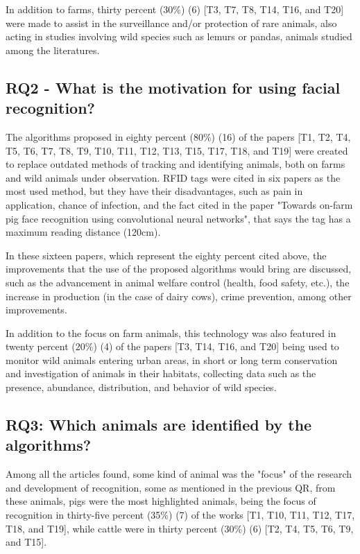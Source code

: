 \documentclass[alpha-refs,english]{RBCA_v3.0}
\begin{document}
In addition to farms, thirty percent (30\%) (6) [T3, T7, T8, T14, T16, and T20] were made to assist in the surveillance and/or protection of rare animals, also acting in studies involving wild species such as lemurs or pandas, animals studied among the literatures.

\subsection{RQ2 - What is the motivation for using facial recognition?}
The algorithms proposed in eighty percent (80\%) (16) of the papers [T1, T2, T4, T5, T6, T7, T8, T9, T10, T11, T12, T13, T15, T17, T18, and T19] were created to replace outdated methods of tracking and identifying animals, both on farms and wild animals under observation. RFID tags were cited in six papers as the most used method, but they have their disadvantages, such as pain in application, chance of infection, and the fact cited in the paper "Towards on-farm pig face recognition using convolutional neural networks", that says the tag has a maximum reading distance (120cm). 

In these sixteen papers, which represent the eighty percent cited above, the improvements that the use of the proposed algorithms would bring are discussed, such as the advancement in animal welfare control (health, food safety, etc.), the increase in production (in the case of dairy cows), crime prevention, among other improvements.

In addition to the focus on farm animals, this technology was also featured in twenty percent (20\%) (4) of the papers [T3, T14, T16, and T20] being used to monitor wild animals entering urban areas, in short or long term conservation and investigation of animals in their habitats, collecting data such as the presence, abundance, distribution, and behavior of wild species.

\subsection{RQ3: Which animals are identified by the algorithms?}
Among all the articles found, some kind of animal was the "focus" of the research and development of recognition, some as mentioned in the previous QR, from these animals, pigs were the most highlighted animals, being the focus of recognition in thirty-five percent (35\%) (7) of the works [T1, T10, T11, T12, T17, T18, and T19], while cattle were in thirty percent (30\%) (6) [T2, T4, T5, T6, T9, and T15]. 
\end{document}
